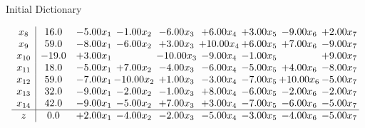 \documentclass[8pt]{article}
\begin{document}
Initial Dictionary 

\[\begin{array}{c| c c@{\hskip 2pt} c@{\hskip 2pt} c@{\hskip 2pt} c@{\hskip 2pt} c@{\hskip 2pt} c@{\hskip 2pt} c@{\hskip 2pt} }
 x_{8}   &  16.0 & -5.00 x_{1} & -1.00 x_{2} & -6.00 x_{3} & +  6.00 x_{4} & +  3.00 x_{5} & -9.00 x_{6} & +  2.00 x_{7}\\
 x_{9}   &  59.0 & -8.00 x_{1} & -6.00 x_{2} & +  3.00 x_{3} & + 10.00 x_{4} & +  6.00 x_{5} & +  7.00 x_{6} & -9.00 x_{7}\\
 x_{10}   &  -19.0 & +  3.00 x_{1} &   & -10.00 x_{3} & -9.00 x_{4} & -1.00 x_{5} &   & +  9.00 x_{7}\\
 x_{11}   &  18.0 & -5.00 x_{1} & +  7.00 x_{2} & -4.00 x_{3} & -6.00 x_{4} & -5.00 x_{5} & +  4.00 x_{6} & -8.00 x_{7}\\
 x_{12}   &  59.0 & -7.00 x_{1} & -10.00 x_{2} & +  1.00 x_{3} & -3.00 x_{4} & -7.00 x_{5} & + 10.00 x_{6} & -5.00 x_{7}\\
 x_{13}   &  32.0 & -9.00 x_{1} & -2.00 x_{2} & -1.00 x_{3} & +  8.00 x_{4} & -6.00 x_{5} & -2.00 x_{6} & -2.00 x_{7}\\
 x_{14}   &  42.0 & -9.00 x_{1} & -5.00 x_{2} & +  7.00 x_{3} & +  3.00 x_{4} & -7.00 x_{5} & -6.00 x_{6} & -5.00 x_{7}\\
\hline
z    &  0.0 & +  2.00 x_{1} & -4.00 x_{2} & -2.00 x_{3} & -5.00 x_{4} & -3.00 x_{5} & -4.00 x_{6} & -5.00 x_{7}\\
\end{array}\]
\end{document}
